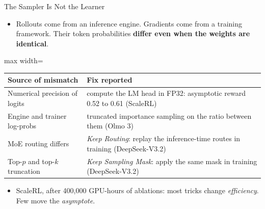 \begin{frame}{The Sampler Is Not the Learner}
    \begin{itemize}\itemsep0.4em
        \item Rollouts come from an inference engine. Gradients come from a training framework. Their token probabilities \textbf{differ even when the weights are identical}.
    \end{itemize}
    \begin{center}
    \small
    \begin{adjustbox}{max width=\linewidth}\begin{tabular}{>{\raggedright\arraybackslash}p{4.0cm}>{\raggedright\arraybackslash}p{9.3cm}}
        \toprule
        \textbf{Source of mismatch} & \textbf{Fix reported} \\
        \midrule
        Numerical precision of logits & compute the LM head in FP32: asymptotic reward 0.52 to 0.61 (ScaleRL) \\
        Engine and trainer log-probs & truncated importance sampling on the ratio between them (Olmo 3) \\
        MoE routing differs & \emph{Keep Routing}: replay the inference-time routes in training (DeepSeek-V3.2) \\
        Top-$p$ and top-$k$ truncation & \emph{Keep Sampling Mask}: apply the same mask in training (DeepSeek-V3.2) \\
        \bottomrule
    \end{tabular}\end{adjustbox}
    \end{center}
    \begin{itemize}\itemsep0.4em
        \item ScaleRL, after 400,000 GPU-hours of ablations: most tricks change \emph{efficiency}. Few move the \emph{asymptote}.
    \end{itemize}
\end{frame}

